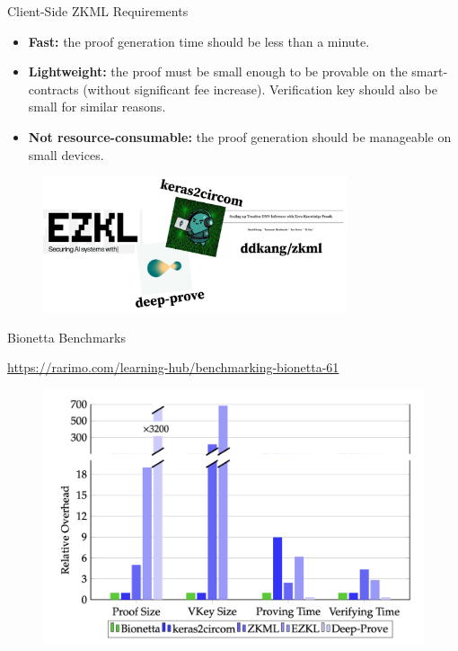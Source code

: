 \documentclass{zkdl-presentation-template}
\newcommand{\cmark}{\textcolor{green!65!black}{\ding{51}}}%
\begin{document}
    \begin{frame}{Client-Side ZKML Requirements}
        \begin{itemize}[label=\cmark]
            \item \textbf{Fast:} the proof generation time should be less than a minute.\pause
            \item \textbf{Lightweight:} the proof must be small enough to be provable on the smart-contracts (without significant fee increase). Verification key 
            should also be small for similar reasons.\pause
            \item \textbf{Not resource-consumable:} the proof generation should be manageable on small devices.
        \end{itemize}

        \begin{figure}
            \centering
            \includegraphics[width=0.8\textwidth]{images/zkml-zoo.pdf}
        \end{figure}
    \end{frame}

    \begin{frame}{Bionetta Benchmarks}
        \begin{center}
            \textcolor{blue}{\url{https://rarimo.com/learning-hub/benchmarking-bionetta-61}}
        \end{center}
        \begin{figure}
            \centering
            \includegraphics[width=\textwidth]{images/benchmarks.png}
        \end{figure}
    \end{frame}
\end{document}
